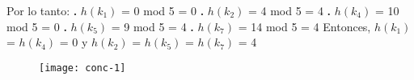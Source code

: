 \documentclass[10pt,a4paper]{article}
\begin{document}
\newline
\newline
Por lo tanto:
\newline
\newline
\textbf{.} $h(k_{1})$ = 0 mod 5 = 0
\newline
\newline
\textbf{.} $h(k_{2})$ = 4 mod 5 = 4
\newline
\newline
\textbf{.} $h(k_{4})$ = 10 mod 5 = 0
\newline
\newline
\textbf{.} $h(k_{5})$ = 9 mod 5 = 4
\newline
\newline
\textbf{.} $h(k_{7})$ = 14 mod 5 = 4
\newline
\newline
Entonces, $h(k_{1})$ = $h(k_{4})$ = 0 y $h(k_{2})$ = $h(k_{5})$ = $h(k_{7})$ = 4
\newline
\begin{figure}[h]
	\centering
\texttt{[image: conc-1]}
	\label{drivers1}
\end{figure}
\end{document}
